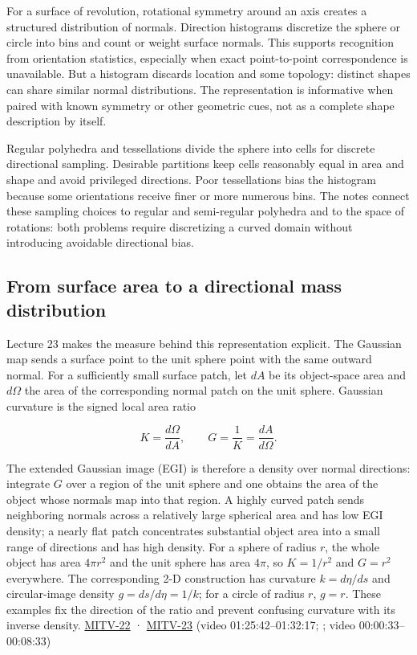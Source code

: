 For a surface of revolution, rotational symmetry around an axis creates a structured distribution of normals. Direction histograms discretize the sphere or circle into bins and count or weight surface normals. This supports recognition from orientation statistics, especially when exact point-to-point correspondence is unavailable. But a histogram discards location and some topology: distinct shapes can share similar normal distributions. The representation is informative when paired with known symmetry or other geometric cues, not as a complete shape description by itself.

Regular polyhedra and tessellations divide the sphere into cells for discrete directional sampling. Desirable partitions keep cells reasonably equal in area and shape and avoid privileged directions. Poor tessellations bias the histogram because some orientations receive finer or more numerous bins. The notes connect these sampling choices to regular and semi-regular polyhedra and to the space of rotations: both problems require discretizing a curved domain without introducing avoidable directional bias.

\subsection{From surface area to a directional mass distribution}\label{04-visual-computing-ii-ch032-from-surface-area-to-a-directional-mass-distribution}

Lecture 23 makes the measure behind this representation explicit. The Gaussian map sends a surface point to the unit sphere point with the same outward normal. For a sufficiently small surface patch, let \(dA\) be its object-space area and \(d\Omega\) the area of the corresponding normal patch on the unit sphere. Gaussian curvature is the signed local area ratio

\[
K=\frac{d\Omega}{dA},\qquad G=\frac{1}{K}=\frac{dA}{d\Omega}.
\]

The extended Gaussian image (EGI) is therefore a density over normal directions: integrate \(G\) over a region of the unit sphere and one obtains the area of the object whose normals map into that region. A highly curved patch sends neighboring normals across a relatively large spherical area and has low EGI density; a nearly flat patch concentrates substantial object area into a small range of directions and has high density. For a sphere of radius \(r\), the whole object has area \(4\pi r^2\) and the unit sphere has area \(4\pi\), so \(K=1/r^2\) and \(G=r^2\) everywhere. The corresponding 2-D construction has curvature \(k=d\eta/ds\) and circular-image density \(g=ds/d\eta=1/k\); for a circle of radius \(r\), \(g=r\). These examples fix the direction of the ratio and prevent confusing curvature with its inverse density. \hyperref[04-visual-computing-ii-ch036-mitv-22---exterior-orientation-recovering-position-orientation-bundle-adjustment-object-shape]{MITV-22} · \hyperref[04-visual-computing-ii-ch036-mitv-23---gaussian-image-solids-of-revolution-direction-histograms-regular-polyhedra]{MITV-23} (video 01:25:42--01:32:17; ; video 00:00:33--00:08:33)

